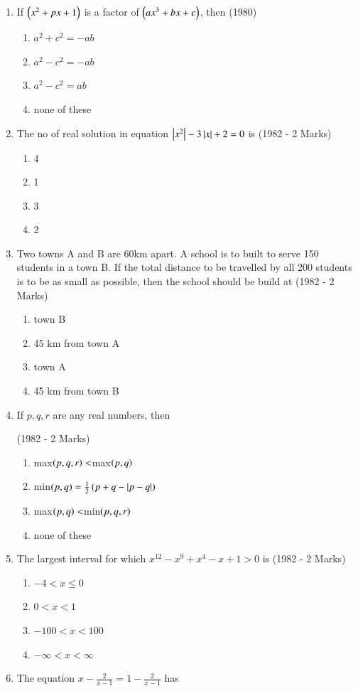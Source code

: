 \documentclass[journal,12pt,twocolumn]{IEEEtran}
\theoremstyle{remark}
\begin{document}
\begin{enumerate}
\begin{enumerate} 
\item 10
\item 2
\item -0.01
\item none of these.
\end{enumerate}
\item If $\left(x^2+px+1\right)$ is a factor of $\left(ax^3+bx+c\right)$, then \hfill (1980)
\begin{enumerate} 
\item $a^2+c^2=-ab$
\item $a^2-c^2=-ab$
\item $a^2-c^2=ab$
\item none of these
\end{enumerate}
\item The no of real solution in equation $\left\vert x^2\right\vert-3\left\vert x\right\vert+2=0$ is \hfill (1982 - 2 Marks)
\begin{enumerate} 
\item 4
\item 1
\item 3
\item 2
\end{enumerate}
\item Two towns A and B are 60km apart. A school is to built to serve 150 students in a town B. If the total distance to be travelled by all 200 students is to be as small as possible, then the school should be build at \hfill (1982 - 2 Marks)
\begin{enumerate}
\item town B
\item 45 km from town A
\item town A
\item 45 km from town B
\end{enumerate}
\item If $p,q,r$ are any real numbers, then 

\hfill (1982 - 2 Marks)
\begin{enumerate}
\item max$\left(p,q,r\right)<$max$\left(p,q\right)$
\item min$\left(p,q\right)=\frac{1}{2}\left(p+q-\left\vert p-q\right\vert\right)$
\item max$\left(p,q\right)<$min$\left(p,q,r\right)$
\item  none of these
\end{enumerate}
\item The largest interval for which $x^{12}-x^9+x^4-x+1>0$ is \hfill (1982 - 2 Marks)
\begin{enumerate}
\item $-4<x\leq0$
\item $0<x<1$
\item $-100<x<100$
\item $-\infty<x<\infty$
\end{enumerate}
\item The equation $x-\frac{2}{x-1}=1-\frac{2}{x-1}$ has


\end{enumerate}
\end{document}
